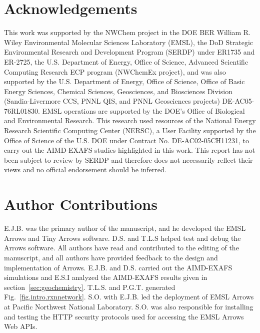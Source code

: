 \documentclass[runningheads,a4paper]{llncs}
\begin{document}

\section*{Acknowledgements}
This work was supported by the NWChem project in
the DOE BER William R. Wiley Environmental Molecular Sciences Laboratory (EMSL),  the DoD Strategic Environmental Research and Development Program (SERDP) under ER1735 and ER-2725, the  U.S. Department of Energy, Office of Science, Advanced Scientific Computing Research ECP program (NWChemEx project),  and was also supported by the U.S. Department of Energy, Office of Science, Office of Basic Energy Sciences, Chemical Sciences, Geosciences, and Biosciences Division (Sandia-Livermore CCS, PNNL QIS, and PNNL Geosciences projects) DE-AC05-76RL01830.  EMSL operations are supported by the DOE's Office of Biological and Environmental Research. This research used resources of the National Energy Research Scientific Computing Center (NERSC), a User Facility supported by the Office of Science of the U.S. DOE under Contract No. DE-AC02-05CH11231, to carry out the AIMD-EXAFS studies highlighted in this work.
This report has not been subject to review by SERDP and therefore does not necessarily reflect their views and no official endorsement should be inferred.


\section*{Author Contributions}
E.J.B. was the primary author of the manuscript, and he developed the EMSL Arrows and Tiny Arrows software.  D.S. and T.L.S helped test and debug the Arrows software. All authors have read and contributed to the editing of the manuscript, and all authors have provided feedback to the design and implementation of Arrows.  E.J.B. and  D.S. carried out the AIMD-EXAFS simulations and E.S.I analyzed the AIMD-EXAFS results given in section~\ref{sec:geochemistry}. T.L.S. and P.G.T. generated Fig.~\ref{fig.intro.rxnnetwork}. 
S.O. with E.J.B. led the deployment of EMSL Arrows at Pacific Northwest National Laboratory.  S.O. was also responsible for installing and testing the HTTP security protocols used for accessing the  EMSL Arrows Web APIs.
\end{document}
